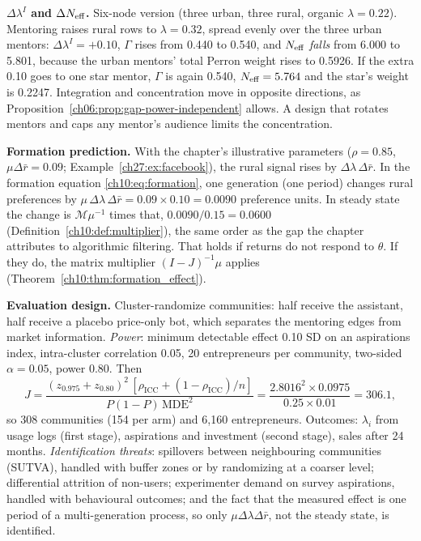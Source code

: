\documentclass[../solutions_manual.tex]{subfiles}
\begin{document}
 \textbf{$\Delta\lambda^I$ and $\Delta N_{\text{eff}}$.} Six-node version (three urban, three rural, organic $\lambda = 0.22$). Mentoring raises rural rows to $\lambda = 0.32$, spread evenly over the three urban mentors: $\Delta\lambda^I = +0.10$, $\Gamma$ rises from 0.440 to 0.540, and $N_{\text{eff}}$ \emph{falls} from 6.000 to 5.801, because the urban mentors' total Perron weight rises to 0.5926. If the extra 0.10 goes to one star mentor, $\Gamma$ is again 0.540, $N_{\text{eff}} = 5.764$ and the star's weight is 0.2247. Integration and concentration move in opposite directions, as Proposition~\ref{ch06:prop:gap-power-independent} allows. A design that rotates mentors and caps any mentor's audience limits the concentration.

 \textbf{Formation prediction.} With the chapter's illustrative parameters ($\rho = 0.85$, $\mu\Delta\bar r = 0.09$; Example~\ref{ch27:ex:facebook}), the rural signal rises by $\Delta\lambda\,\Delta\bar r$. In the formation equation \eqref{ch10:eq:formation}, one generation (one period) changes rural preferences by $\mu\,\Delta\lambda\,\Delta\bar r = 0.09 \times 0.10 = 0.0090$ preference units. In steady state the change is $\mathcal{M}\mu^{-1}$ times that, $0.0090/0.15 = 0.0600$ (Definition~\ref{ch10:def:multiplier}), the same order as the gap the chapter attributes to algorithmic filtering. That holds if returns do not respond to $\theta$. If they do, the matrix multiplier $(I-J)^{-1}\mu$ applies (Theorem~\ref{ch10:thm:formation_effect}).

 \textbf{Evaluation design.} Cluster-randomize communities: half receive the assistant, half receive a placebo price-only bot, which separates the mentoring edges from market information. \emph{Power}: minimum detectable effect 0.10 SD on an aspirations index, intra-cluster correlation 0.05, 20 entrepreneurs per community, two-sided $\alpha = 0.05$, power 0.80. Then
\[
J = \frac{(z_{0.975} + z_{0.80})^2\,[\rho_{\text{ICC}} + (1-\rho_{\text{ICC}})/n]}{P(1-P)\,\text{MDE}^2} = \frac{2.8016^2 \times 0.0975}{0.25 \times 0.01} = 306.1,
\]
so 308 communities (154 per arm) and 6{,}160 entrepreneurs. Outcomes: $\lambda_i$ from usage logs (first stage), aspirations and investment (second stage), sales after 24 months. \emph{Identification threats}: spillovers between neighbouring communities (SUTVA), handled with buffer zones or by randomizing at a coarser level; differential attrition of non-users; experimenter demand on survey aspirations, handled with behavioural outcomes; and the fact that the measured effect is one period of a multi-generation process, so only $\mu\Delta\lambda\Delta\bar r$, not the steady state, is identified.
\end{document}
